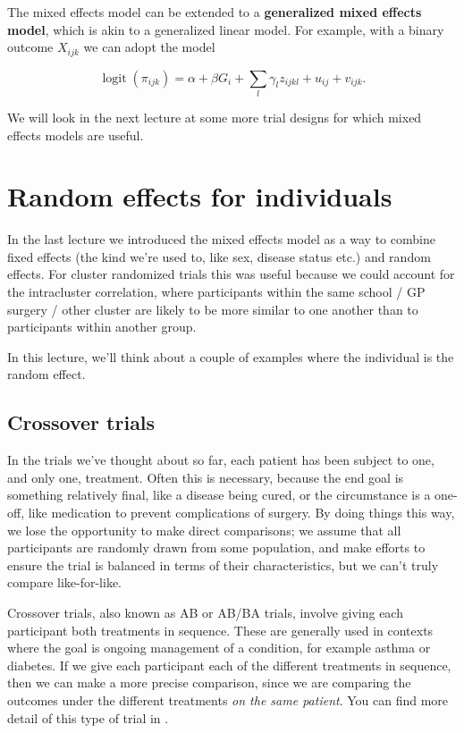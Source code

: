 \documentclass[
  openany]{book}
\theoremstyle{definition}
\theoremstyle{definition}
\theoremstyle{definition}
\theoremstyle{definition}
\theoremstyle{remark}
\begin{document}
The mixed effects model can be extended to a \textbf{generalized mixed effects model}, which is akin to a generalized linear model. For example, with a binary outcome \(X_{ijk}\) we can adopt the model

\[
\operatorname{logit}\left(\pi_{ijk}\right) = \alpha + \beta G_i + \sum\limits_l \gamma_l z_{ijkl} + u_{ij} + v_{ijk}.
\]

We will look in the next lecture at some more trial designs for which mixed effects models are useful.

\hypertarget{random-effects-for-individuals}{%
\chapter{Random effects for individuals}\label{random-effects-for-individuals}}

In the last lecture we introduced the mixed effects model as a way to combine fixed effects (the kind we're used to, like sex, disease status etc.) and random effects. For cluster randomized trials this was useful because we could account for the intracluster correlation, where participants within the same school / GP surgery / other cluster are likely to be more similar to one another than to participants within another group.

In this lecture, we'll think about a couple of examples where the individual is the random effect.

\hypertarget{crossover-trials}{%
\section{Crossover trials}\label{crossover-trials}}

In the trials we've thought about so far, each patient has been subject to one, and only one, treatment. Often this is necessary, because the end goal is something relatively final, like a disease being cured, or the circumstance is a one-off, like medication to prevent complications of surgery. By doing things this way, we lose the opportunity to make direct comparisons; we assume that all participants are randomly drawn from some population, and make efforts to ensure the trial is balanced in terms of their characteristics, but we can't truly compare like-for-like.

Crossover trials, also known as AB or AB/BA trials, involve giving each participant both treatments in sequence. These are generally used in contexts where the goal is ongoing management of a condition, for example asthma or diabetes. If we give each participant each of the different treatments in sequence, then we can make a more precise comparison, since we are comparing the outcomes under the different treatments \emph{on the same patient}. You can find more detail of this type of trial in \citet{armitage1982two}.
\end{document}
